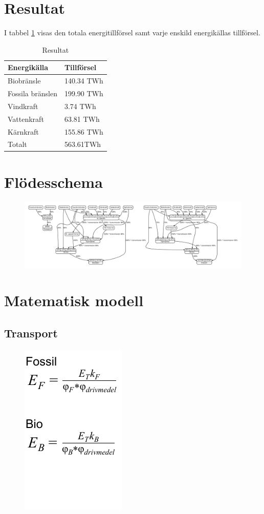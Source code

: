 \documentclass[a4paper,11pt,fleqn, titlepage]{article}
\begin{document}
\section{Resultat}

I tabbel \ref{resultat} visas den totala energitillförsel samt varje enskild energikällas tillförsel.
\begin{table}[h!]
	\centering
	\begin{tabular}{||l l||}
		\hline
		Energikälla & Tillförsel \\
		\hline
		\hline
		Biobränsle & 140.34 TWh\\
		Fossila bränslen & 199.90 TWh \\
		Vindkraft & 3.74 TWh\\
		Vattenkraft & 63.81 TWh\\
		Kärnkraft & 155.86 TWh\\
		\hline
		\hline
		Totalt & 563.61TWh\\
		\hline
	\end{tabular}
	\caption{Resultat}
	\label{resultat}
\end{table}


\appendix
\section{Flödesschema}
\begin{figure}[h!]
	\centering 
 		\includegraphics[scale = 0.2]{diagram.pdf}
		\label{diagram}
\end{figure}
\section {Matematisk modell}
\subsection{Transport}
\begin{figure}[h!]
	\centering 
 		\includegraphics[scale = 0.75]{transport2.pdf}
		\label{diagram}
\end{figure}
\end{document}
